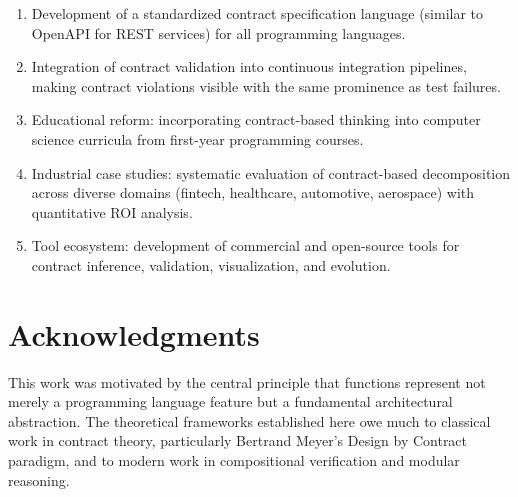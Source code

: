 \documentclass[a4paper,12pt]{article}
\theoremstyle{definition}
\begin{document}
\begin{enumerate}
	\item Development of a standardized contract specification language (similar to OpenAPI for REST services) for all programming languages.
	
	\item Integration of contract validation into continuous integration pipelines, making contract violations visible with the same prominence as test failures.
	
	\item Educational reform: incorporating contract-based thinking into computer science curricula from first-year programming courses.
	
	\item Industrial case studies: systematic evaluation of contract-based decomposition across diverse domains (fintech, healthcare, automotive, aerospace) with quantitative ROI analysis.
	
	\item Tool ecosystem: development of commercial and open-source tools for contract inference, validation, visualization, and evolution.
\end{enumerate}

\section*{Acknowledgments}

This work was motivated by the central principle that functions represent not merely a programming language feature but a fundamental architectural abstraction. The theoretical frameworks established here owe much to classical work in contract theory, particularly Bertrand Meyer's Design by Contract paradigm, and to modern work in compositional verification and modular reasoning.
\end{document}
